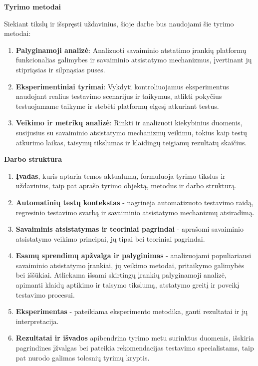\documentclass[
]{VUMIFPSkursinis}
\begin{document}
\textbf{Tyrimo metodai}

Siekiant tikslų ir išspręsti uždavinius, šioje darbe bus naudojami šie tyrimo metodai:

\begin{enumerate}
    \item \textbf{Palyginamoji analizė}: Analizuoti savaiminio atstatimo įrankių platformų funkcionalias galimybes ir savaiminio atsistatymo mechanizmus, įvertinant jų stipriąsias ir silpnąsias puses.
    \item \textbf{Eksperimentiniai tyrimai}: Vykdyti kontroliuojamus eksperimentus naudojant realius testavimo scenarijus ir taikymus, atlikti pokyčius testuojamame taikyme ir stebėti platformų elgesį atkuriant testus.
    \item \textbf{Veikimo ir metrikų analizė}: Rinkti ir analizuoti kiekybinius duomenis, susijusius su savaiminio atsistatymo mechanizmų veikimu, tokius kaip testų atkūrimo laikas, taisymų tikslumas ir klaidingų teigiamų rezultatų skaičius.
\end{enumerate}

\textbf{Darbo struktūra}
\begin{enumerate}
    \item \textbf{Įvadas}, kuris aptaria temos aktualumą, formuluoja tyrimo tikslus ir uždavinius, taip pat aprašo tyrimo objektą, metodus ir darbo struktūrą.
    \item \textbf{Automatinių testų kontekstas} - nagrinėja automatizuoto testavimo raidą, regresinio testavimo svarbą ir savaiminio atsistatymo mechanizmų atsiradimą.
    \item \textbf{Savaiminis atsistatymas ir teoriniai pagrindai} - aprašomi savaiminio atsistatymo veikimo principai, jų tipai bei teoriniai pagrindai.
    \item \textbf{Esamų sprendimų apžvalga ir palyginimas} - analizuojami populiariausi savaiminio atsistatymo įrankiai, jų veikimo metodai, pritaikymo galimybės bei iššūkiai.
    Atliekama išsami skirtingų įrankių palyginamoji analizė, apimanti klaidų aptikimo ir taisymo tikslumą, atstatymo greitį ir poveikį testavimo procesui.
    \item \textbf{Eksperimentas} - pateikiama eksperimento metodika, gauti rezultatai ir jų interpretacija.
    \item \textbf{Rezultatai ir išvados} apibendrina tyrimo metu surinktus duomenis, išskiria pagrindines įžvalgas bei pateikia rekomendacijas testavimo specialistams, taip pat nurodo galimas tolesnių tyrimų kryptis.
\end{enumerate}
\end{document}
